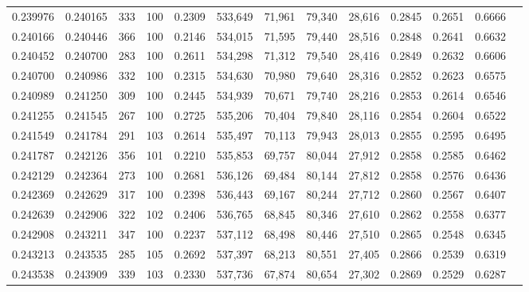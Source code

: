 \begin{tabular}{rrrrrrrrrrrrr}
0.239976 & 0.240165 &   333 & 100 &                                     0.2309 & 533,649 &  71,961 &  79,340 &  28,616 & 0.2845 & 0.2651 & 0.6666 \\
0.240166 & 0.240446 &   366 & 100 &                                     0.2146 & 534,015 &  71,595 &  79,440 &  28,516 & 0.2848 & 0.2641 & 0.6632 \\
0.240452 & 0.240700 &   283 & 100 &                                     0.2611 & 534,298 &  71,312 &  79,540 &  28,416 & 0.2849 & 0.2632 & 0.6606 \\
0.240700 & 0.240986 &   332 & 100 &                                     0.2315 & 534,630 &  70,980 &  79,640 &  28,316 & 0.2852 & 0.2623 & 0.6575 \\
0.240989 & 0.241250 &   309 & 100 &                                     0.2445 & 534,939 &  70,671 &  79,740 &  28,216 & 0.2853 & 0.2614 & 0.6546 \\
0.241255 & 0.241545 &   267 & 100 &                                     0.2725 & 535,206 &  70,404 &  79,840 &  28,116 & 0.2854 & 0.2604 & 0.6522 \\
0.241549 & 0.241784 &   291 & 103 &                                     0.2614 & 535,497 &  70,113 &  79,943 &  28,013 & 0.2855 & 0.2595 & 0.6495 \\
0.241787 & 0.242126 &   356 & 101 &                                     0.2210 & 535,853 &  69,757 &  80,044 &  27,912 & 0.2858 & 0.2585 & 0.6462 \\
0.242129 & 0.242364 &   273 & 100 &                                     0.2681 & 536,126 &  69,484 &  80,144 &  27,812 & 0.2858 & 0.2576 & 0.6436 \\
0.242369 & 0.242629 &   317 & 100 &                                     0.2398 & 536,443 &  69,167 &  80,244 &  27,712 & 0.2860 & 0.2567 & 0.6407 \\
0.242639 & 0.242906 &   322 & 102 &                                     0.2406 & 536,765 &  68,845 &  80,346 &  27,610 & 0.2862 & 0.2558 & 0.6377 \\
0.242908 & 0.243211 &   347 & 100 &                                     0.2237 & 537,112 &  68,498 &  80,446 &  27,510 & 0.2865 & 0.2548 & 0.6345 \\
0.243213 & 0.243535 &   285 & 105 &                                     0.2692 & 537,397 &  68,213 &  80,551 &  27,405 & 0.2866 & 0.2539 & 0.6319 \\
0.243538 & 0.243909 &   339 & 103 &                                     0.2330 & 537,736 &  67,874 &  80,654 &  27,302 & 0.2869 & 0.2529 & 0.6287 \\

\end{tabular}
